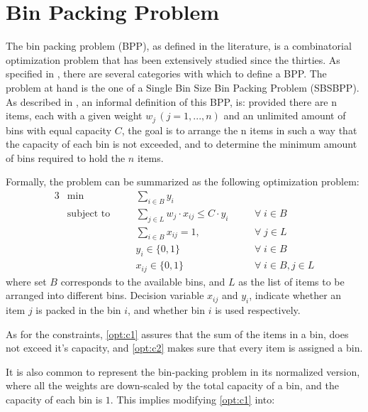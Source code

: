 \chapter{Bin Packing Problem} 
\label{chap:literature review}

The bin packing problem (BPP), as defined in the literature, is a combinatorial
optimization problem that has been extensively studied since the thirties. As
specified in \cite{wascher2007improved}, there are several categories with which
to define a BPP. The problem at hand is the one of a Single Bin Size Bin Packing
Problem (SBSBPP). As described in \cite{delorme2016bin}, an informal definition
of this BPP, is: provided there are n items, each with a given weight \( w_j  \,
(j = 1, ..., n) \) and an unlimited amount of bins with equal capacity \( C \),
the goal is to arrange the n items in such a way that the capacity of each bin
is not exceeded, and to determine the minimum amount of bins required to hold
the $n$ items.

Formally, the problem can be summarized as the following optimization problem:
\begin{alignat}{3}
    &\min       
        &&\sum_{i \in B} y_i 
            && \\
    &\text{subject to} \quad
        && \sum_{j \in L} w_j \cdot x_{ij} \leq C \cdot y_i \quad      
            && \forall \; i \in B \label{opt:c1} \\
    &   && \sum_{i \in B} x_{ij} = 1, \quad                 
            && \forall \; j \in L \label{opt:c2} \\
    &   && y_i \in \{0, 1\}                                 
            && \forall \; i \in B \\
    &   && x_{ij} \in \{0,1\}                               
            && \forall \; i \in B, j \in L
\end{alignat}
where set $B$ corresponds to the available bins, and $L$ as the list of items to
be arranged into different bins. Decision variable $x_{ij}$ and $y_i$, indicate
whether an item $j$ is packed in the bin $i$, and  whether bin $i$ is used
respectively. 

As for the constraints, \ref{opt:c1} assures that the sum of the items in a bin,
does not exceed it's capacity, and \ref{opt:c2} makes sure that every item is
assigned a bin. 

It is also common to represent the bin-packing problem in its normalized
version, where all the weights are down-scaled by the total capacity of a bin,
and the capacity of each bin is $1$. This implies modifying \ref{opt:c1} into:

